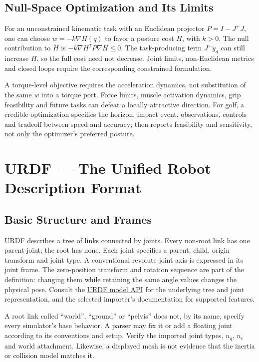 \subsection{Null-Space Optimization and Its Limits}
\label{ex:ch23_elbow_swivel_null_space}

For an unconstrained kinematic task with an Euclidean projector $P=I-J^+J$, one can choose $w=-k\nabla H(q)$ to favor a posture cost $H$, with $k>0$. The null contribution to $\dot H$ is $-k\nabla H^TP\nabla H\leq0$. The task-producing term $J^+\dot y_d$ can still increase $H$, so the full cost need not decrease. Joint limits, non-Euclidean metrics and closed loops require the corresponding constrained formulation.

A torque-level objective requires the acceleration dynamics, not substitution of the same $w$ into a torque port. Force limits, muscle activation dynamics, grip feasibility and future tasks can defeat a locally attractive direction. For golf, a credible optimization specifies the horizon, impact event, observations, controls and tradeoff between speed and accuracy; then reports feasibility and sensitivity, not only the optimizer's preferred posture.

\section{URDF --- The Unified Robot Description Format}
\label{sec:urdf}

\subsection{Basic Structure and Frames}

URDF describes a tree of links connected by joints. Every non-root link has one parent joint; the root has none. Each joint specifies a parent, child, origin transform and joint type. A conventional revolute joint axis is expressed in its joint frame. The zero-position transform and rotation sequence are part of the definition: changing them while retaining the same angle values changes the physical pose. Consult the \href{https://docs.ros.org/kinetic/api/urdf/html/index.html}{URDF model API} for the underlying tree and joint representation, and the selected importer's documentation for supported features.

A root link called ``world'', ``ground'' or ``pelvis'' does not, by its name, specify every simulator's base behavior. A parser may fix it or add a floating joint according to its conventions and setup. Verify the imported joint types, $n_q$, $n_v$ and world attachment. Likewise, a displayed mesh is not evidence that the inertia or collision model matches it.

